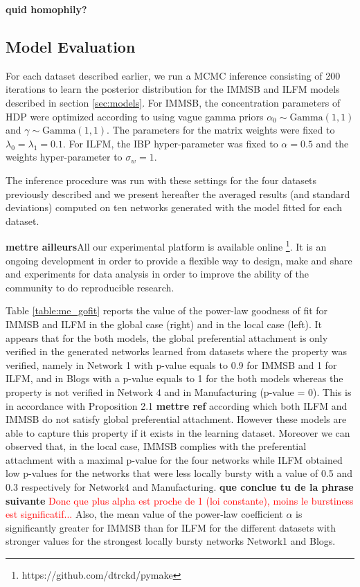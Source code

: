\textbf{quid homophily?}






\subsection{Model Evaluation}
For each dataset described earlier, we run a MCMC inference consisting of 200 iterations to learn the posterior distribution for the IMMSB and ILFM  models described in section \ref{sec:models}. For IMMSB, the concentration parameters of HDP were optimized according to \cite{HDP} using vague gamma priors $\alpha_0 \sim \text{Gamma}(1,1)$ and $\gamma \sim \text{Gamma}(1,1)$. The parameters for the matrix weights were fixed to $\lambda_0=\lambda_1=0.1$. For ILFM, the IBP hyper-parameter was fixed to $\alpha=0.5$ and the weights hyper-parameter to $\sigma_w = 1$. 

The inference procedure was run with these settings for the four datasets previously described and we present hereafter the averaged results (and standard deviations) computed on ten networks generated with the model fitted for each dataset.

\textbf{mettre ailleurs}All our experimental platform is available online \footnote{https://github.com/dtrckd/pymake}. It is an ongoing development in order to provide a flexible way to design, make and share and experiments for data analysis in order to improve the ability of the community to do reproducible research.

Table \ref{table:me_gofit} reports the value of the power-law goodness of fit for IMMSB and ILFM in the global case (right) and in the local case (left). It appears that for the both models, the global preferential attachment is only verified in the generated networks learned from datasets where the property was verified, namely in Network 1 with p-value equals to 0.9 for IMMSB and 1 for ILFM, and in Blogs with a p-value equals to 1 for the both models whereas the property is not verified in Network 4 and in Manufacturing (p-value = 0). This is in accordance with Proposition 2.1 \textbf{mettre ref} according which both ILFM and IMMSB do not satisfy global preferential attachment. However these models are able to capture this property if it exists in the learning dataset.  Moreover we can observed that, in the local case, IMMSB complies with the preferential attachment with a maximal p-value for the four networks while ILFM obtained low p-values for the networks that were less locally bursty with a value of 0.5 and 0.3 respectively for Network4 and Manufacturing. \textbf{que conclue tu de la phrase suivante} \textcolor{red}{Donc que plus alpha est proche de 1 (loi constante), moins le burstiness est significatif...} Also, the mean value of the power-law coefficient $\alpha$ is significantly greater for IMMSB than for ILFM for the different datasets with stronger values for the strongest locally bursty networks Network1 and Blogs.

